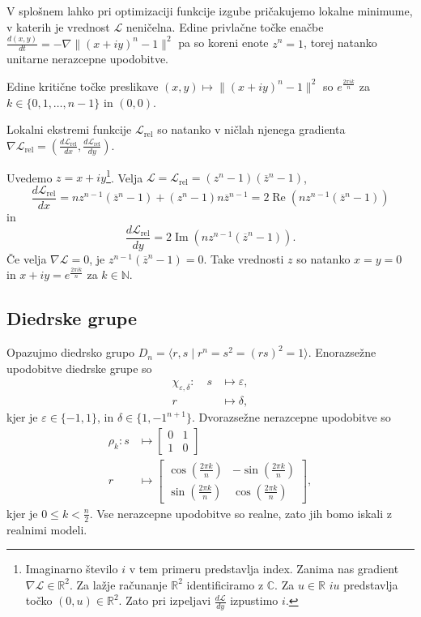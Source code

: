 \documentclass[mat2, tisk]{fmfdelo}
\newcommand{\TODO}[1]{{\color{blue} TODO: #1}}
\newcommand{\R}{\mathbb R}
\newcommand{\N}{\mathbb N}
\newcommand{\loss}{\mathcal L}
\newcommand{\Loss}[1]{\mathcal L _\text{#1}}
\newcommand{\C}{\mathbb C}
\begin{document}
V splošnem lahko pri optimizaciji funkcije izgube pričakujemo
lokalne minimume, v katerih je vrednost $\loss$ neničelna.
Edine privlačne točke enačbe $\frac{d(x,y)}{dt} = -\nabla \|(x
+ iy)^n -1\|^2$ pa so koreni enote $z^n=1$, torej natanko
unitarne nerazcepne upodobitve.
\begin{izrek}
  \label{izrek:kritične točke ciklične}
  Edine kritične točke preslikave $(x,y) \mapsto \|(x + iy)^n
  -1\|^2$ so $e^\frac{2 \pi i k}{n}$  za $k \in \{0,1, \dotsc,
  n-1\}$ in $(0,0)$.
\end{izrek}
\begin{dokaz}
  Lokalni ekstremi funkcije $\Loss{rel}$ so natanko v ničlah
  njenega gradienta $\nabla \Loss{rel} =
  (\frac{d\Loss{rel}}{dx}, \frac{d\Loss{rel}}{dy})$.

  Uvedemo $z = x + iy$\footnote{Imaginarno število $i$ v tem primeru
    predstavlja index.
    Zanima nas gradient $\nabla \loss \in \R^2$. Za lažje
    računanje $\R^2$ identificiramo z $\C$.
    Za $u   \in \R$  $iu$ predstavlja točko $(0, u) \in \R^2$.
  Zato pri izpeljavi $\frac{d\loss}{dy}$ izpustimo $i$.}.
  Velja $\loss = \Loss{rel} = (z^n-1)(\overline{z}^n-1)$,
  $$\frac{d\Loss{rel}}{dx} = nz^{n-1}(\overline{z}^n -1) + (z^n
  -1) n \overline{z}^{n-1} = 2 \operatorname{Re}(n
  z^{n-1}(\overline{z}^n -1))
  $$
  in
  $$\frac{d\Loss{rel}}{dy} =
  2\operatorname{Im}(n z^{n-1}(\overline{z}^n -1)).
  $$
  Če velja $\nabla \loss = 0$, je $z^{n-1}(\overline{z} ^n -1)
  = 0$. Take vrednosti $z$ so natanko $x=y=0$ in $x + iy =
  e^\frac{2 \pi i k}{n}$ za $k \in \N$.
\end{dokaz}

\subsection{Diedrske grupe}
\label{subsection:diedrske-grupe}
Opazujmo diedrsko grupo $D_n = \langle r, s \mid r^n=s^2 = (rs)^2 = 1 \rangle$.
Enorazsežne upodobitve diedrske grupe so
\begin{align*}
  \chi_{\varepsilon, \delta} \colon \quad
  s &\mapsto \varepsilon, \\
  r &\mapsto \delta,
\end{align*}
kjer je  \( \varepsilon \in \{-1, 1\} \), in $\delta \in \{1,
-1^{n + 1}\}$.
Dvorazsežne nerazcepne upodobitve so
\begin{align*}
  \rho_k \colon  s &\mapsto
  \begin{bmatrix}
    0 & 1 \\
    1 & 0
  \end{bmatrix}\\
  r &\mapsto
  \begin{bmatrix}
    \cos\left(\frac{2\pi k}{n}\right) & -\sin\left(\frac{2\pi
    k}{n}\right) \\
    \sin\left(\frac{2\pi k}{n}\right) & \cos\left(\frac{2\pi k}{n}\right)
  \end{bmatrix},
\end{align*}
kjer je $0 \leq k < \frac{n}{2} $. Vse nerazcepne upodobitve so
realne, zato jih bomo iskali z realnimi modeli.
\end{document}
